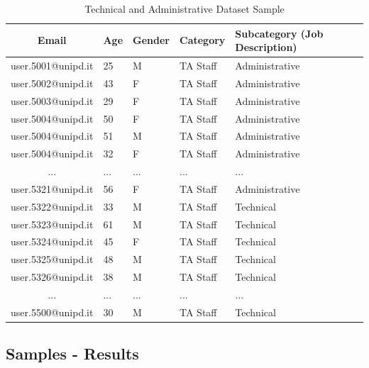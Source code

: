 \documentclass[a4paper]{article}
\begin{document}
\bigskip

\begingroup
\renewcommand{\arraystretch}{1.25}
\begin{table}[ht!]
\begin{center}
    \begin{tabular}{ | c | l | l | l | l | l | }
    \hline
    \textbf{Email} & \textbf{Age} & \textbf{Gender} & \textbf{Category} & \textbf{Subcategory (Job Description)} \\
    \hline
    user.5001@unipd.it & 25 & M & TA Staff & Administrative \\
    \hline
    user.5002@unipd.it & 43 & F & TA Staff & Administrative \\
    \hline
    user.5003@unipd.it & 29 & F & TA Staff & Administrative \\
    \hline
    user.5004@unipd.it & 50 & F & TA Staff & Administrative \\
    \hline
    user.5004@unipd.it & 51 & M & TA Staff & Administrative \\
    \hline
    user.5004@unipd.it & 32 & F & TA Staff & Administrative \\
    \hline
    ... & ... & ... & ... & ... \\
    \hline
    user.5321@unipd.it & 56 & F & TA Staff & Administrative \\
    \hline
    user.5322@unipd.it & 33 & M & TA Staff & Technical \\
    \hline
    user.5323@unipd.it & 61 & M & TA Staff & Technical \\
    \hline
    user.5324@unipd.it & 45 & F & TA Staff & Technical \\
    \hline
    user.5325@unipd.it & 48 & M & TA Staff & Technical \\
    \hline
    user.5326@unipd.it & 38 & M & TA Staff & Technical \\
    \hline
    ... & ... & ... & ... & ... \\
    \hline
    user.5500@unipd.it & 30 & M & TA Staff & Technical \\
    \hline
    \end{tabular}
\end{center}
\caption{Technical and Administrative Dataset Sample}
\label{t-ta-sample}
\end{table}

\newpage

\subsection*{Samples - Results} \hypertarget{appendix-samples-results}{}
\end{document}
